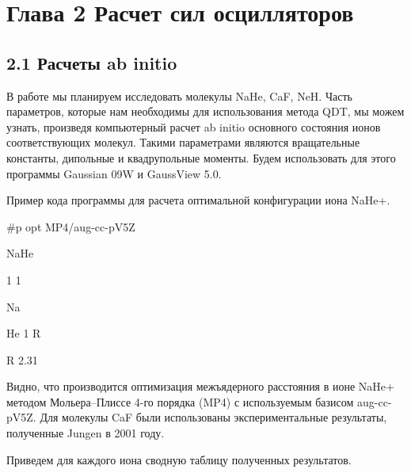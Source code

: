 \documentclass[a4paper]{article}
\begin{document}
\bigskip


\bigskip


\bigskip

\clearpage\section{Глава 2 Расчет
сил осцилляторов}
\hypertarget{RefHeading4695463868395}{}\subsection[2.1 Расчеты ab
initio]{2.1 Расчеты \foreignlanguage{english}{ab}
\foreignlanguage{english}{initio}}
\hypertarget{RefHeading4697463868395}{}В работе мы
планируем исследовать
молекулы \foreignlanguage{english}{NaHe},
\foreignlanguage{english}{CaF}, \foreignlanguage{english}{NeH}. Часть
параметров, которые нам необходимы для использования
метода \foreignlanguage{english}{QDT}, мы
можем узнать, произведя компьютерный
расчет \foreignlanguage{english}{ab} \foreignlanguage{english}{initio}
основного состояния ионов соответствующих молекул. Такими параметрами являются вращательные константы, дипольные и квадрупольные моменты. Будем использовать для этого программы
\foreignlanguage{english}{Gaussian} 09\foreignlanguage{english}{W} и \foreignlanguage{english}{GaussView} 5.0.

Пример кода программы для расчета оптимальной конфигурации иона
\foreignlanguage{english}{NaHe}+.

\foreignlanguage{english}{\#p opt MP4/aug-cc-pV5Z}

\foreignlanguage{english}{NaHe}

\foreignlanguage{english}{1 1}

\foreignlanguage{english}{Na \ \ \ \ \ \ \ \ \ \ \ \ }

\foreignlanguage{english}{He 1 R}

\foreignlanguage{english}{R 2.31}

Видно, что производится оптимизация межъядерного расстояния в ионе
\foreignlanguage{english}{NaHe}+ методом
Мольера--Плиссе 4-го
порядка (\foreignlanguage{english}{MP}4) с
используемым базисом aug-cc-pV5Z. Для
молекулы \foreignlanguage{english}{CaF}
были использованы экспериментальные результаты,
полученные \foreignlanguage{english}{Jungen} в
2001 году.

Приведем для каждого иона сводную таблицу полученных результатов.
\end{document}
